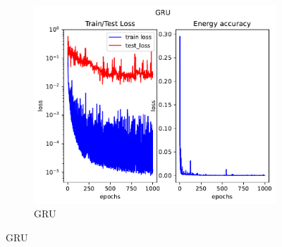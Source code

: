 \begin{figure}[H]
\begin{subfigure}[b]{0.3\textwidth}
		\centering
		\includegraphics[width=\textwidth]{chapters/chapter5/body2_gru_loss.pdf}
		\caption{GRU}
	\end{subfigure}
	
	\vspace{0.5cm} %
	

\end{figure}
